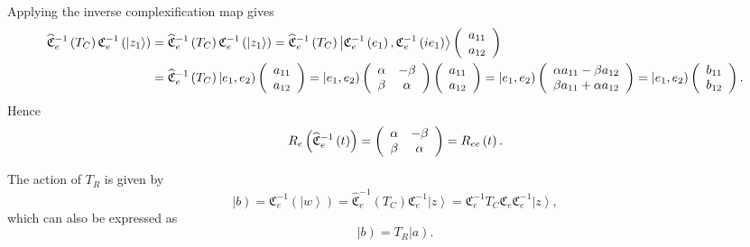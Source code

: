 \documentclass[aps,preprint]{revtex4}%
\begin{document}
Applying the inverse complexification map gives%
\begin{align}
\widehat{\mathfrak{C}}_{e}^{-1}\left(  T_{C}\right)  \mathfrak{C}_{e}%
^{-1}\left(  \left\vert z_{1}\right\rangle \right)   &  =\widehat{\mathfrak{C}%
}_{e}^{-1}\left(  T_{C}\right)  \mathfrak{C}_{e}^{-1}\left(  \left\vert
z_{1}\right\rangle \right)  =\widehat{\mathfrak{C}}_{e}^{-1}\left(
T_{C}\right)  \left\vert \mathfrak{C}_{e}^{-1}\left(  e_{1}\right)
,\mathfrak{C}_{e}^{-1}\left(  ie_{1}\right)  \right\rangle \left(
\begin{array}
[c]{c}%
a_{11}\\
a_{12}%
\end{array}
\right) \\
&  =\widehat{\mathfrak{C}}_{e}^{-1}\left(  T_{C}\right)  \left\vert
e_{1},e_{2}\right)  \left(
\begin{array}
[c]{c}%
a_{11}\\
a_{12}%
\end{array}
\right)  =\left\vert e_{1},e_{2}\right)  \left(
\begin{array}
[c]{cc}%
\alpha & -\beta\\
\beta & \alpha
\end{array}
\right)  \left(
\begin{array}
[c]{c}%
a_{11}\\
a_{12}%
\end{array}
\right)  =\left\vert e_{1},e_{2}\right)  \left(
\begin{array}
[c]{c}%
\alpha a_{11}-\beta a_{12}\\
\beta a_{11}+\alpha a_{12}%
\end{array}
\right)  =\left\vert e_{1},e_{2}\right)  \left(
\begin{array}
[c]{c}%
b_{11}\\
b_{12}%
\end{array}
\right)  .
\end{align}
Hence
\begin{equation}
R_{e}\left(  \widehat{\mathfrak{C}}_{e}^{-1}\left(  t\right)  \right)
=\left(
\begin{array}
[c]{cc}%
\alpha & -\beta\\
\beta & \alpha
\end{array}
\right)  =R_{ee}\left(  t\right)  .
\end{equation}


The action of $T_{R}$ is given by%
\begin{equation}
\left\vert b\right)  =\mathfrak{C}_{e}^{-1}\left(  \left\vert w\right\rangle
\right)  =\widehat{\mathfrak{C}}_{e}^{-1}\left(  T_{C}\right)  \mathfrak{C}%
_{e}^{-1}\left\vert z\right\rangle =\mathfrak{C}_{e}^{-1}T_{C}\mathfrak{C}%
_{e}\mathfrak{C}_{e}^{-1}\left\vert z\right\rangle ,
\end{equation}
which can also be expressed as%
\begin{equation}
\left\vert b\right)  =T_{R}\left\vert a\right)  .
\end{equation}
\end{document}

